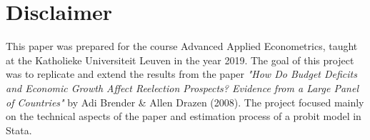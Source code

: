 \section*{Disclaimer}
This paper was prepared for the course Advanced Applied Econometrics, taught at the Katholieke Universiteit Leuven in the year 2019. 
The goal of this project was to replicate and extend the results from the paper \textit{"How Do Budget Deficits and Economic Growth Affect 
Reelection Prospects? Evidence from a Large Panel of Countries"} by Adi Brender \& Allen Drazen (2008). The project focused mainly on the technical aspects of the paper and estimation process of a probit model in Stata. 
\pagebreak